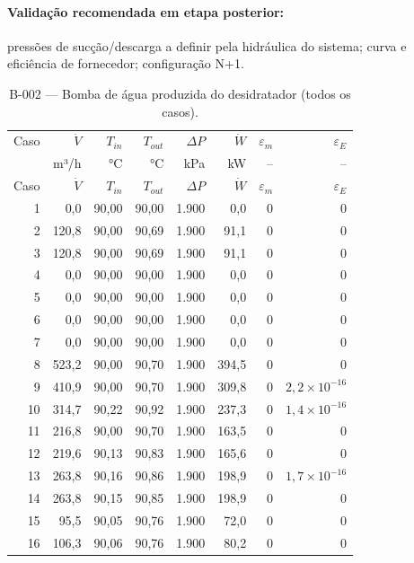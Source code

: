 \documentclass[11pt,a4paper]{article}
\numberwithin{equation}{section}
\numberwithin{table}{section}
\numberwithin{figure}{section}
\begin{document}
\paragraph{Validação recomendada em etapa posterior:} pressões de sucção/descarga a definir pela hidráulica do sistema; curva e eficiência de fornecedor; configuração N+1.
{\footnotesize\setlength{\tabcolsep}{3.5pt}\begin{longtable}{rrrrrrrr}
\caption{B-002 --- Bomba de água produzida do desidratador (todos os casos).\label{tab:b002}}\\\toprule
Caso & $\dot V$ & $T_{in}$ & $T_{out}$ & $\Delta P$ & $\dot W$ & $\varepsilon_m$ & $\varepsilon_E$\\
 & m³/h & °C & °C & kPa & kW & -- & --\\\midrule\endfirsthead
\toprule Caso & $\dot V$ & $T_{in}$ & $T_{out}$ & $\Delta P$ & $\dot W$ & $\varepsilon_m$ & $\varepsilon_E$\\\midrule\endhead
1 & 0,0 & 90,00 & 90,00 & 1.900 & 0,0 & $0$ & $0$\\
2 & 120,8 & 90,00 & 90,69 & 1.900 & 91,1 & $0$ & $0$\\
3 & 120,8 & 90,00 & 90,69 & 1.900 & 91,1 & $0$ & $0$\\
4 & 0,0 & 90,00 & 90,00 & 1.900 & 0,0 & $0$ & $0$\\
5 & 0,0 & 90,00 & 90,00 & 1.900 & 0,0 & $0$ & $0$\\
6 & 0,0 & 90,00 & 90,00 & 1.900 & 0,0 & $0$ & $0$\\
7 & 0,0 & 90,00 & 90,00 & 1.900 & 0,0 & $0$ & $0$\\
8 & 523,2 & 90,00 & 90,70 & 1.900 & 394,5 & $0$ & $0$\\
9 & 410,9 & 90,00 & 90,70 & 1.900 & 309,8 & $0$ & $2{,}2\times10^{-16}$\\
10 & 314,7 & 90,22 & 90,92 & 1.900 & 237,3 & $0$ & $1{,}4\times10^{-16}$\\
11 & 216,8 & 90,00 & 90,70 & 1.900 & 163,5 & $0$ & $0$\\
12 & 219,6 & 90,13 & 90,83 & 1.900 & 165,6 & $0$ & $0$\\
13 & 263,8 & 90,16 & 90,86 & 1.900 & 198,9 & $0$ & $1{,}7\times10^{-16}$\\
14 & 263,8 & 90,15 & 90,85 & 1.900 & 198,9 & $0$ & $0$\\
15 & 95,5 & 90,05 & 90,76 & 1.900 & 72,0 & $0$ & $0$\\
16 & 106,3 & 90,06 & 90,76 & 1.900 & 80,2 & $0$ & $0$\\
\bottomrule\end{longtable}}
\end{document}
